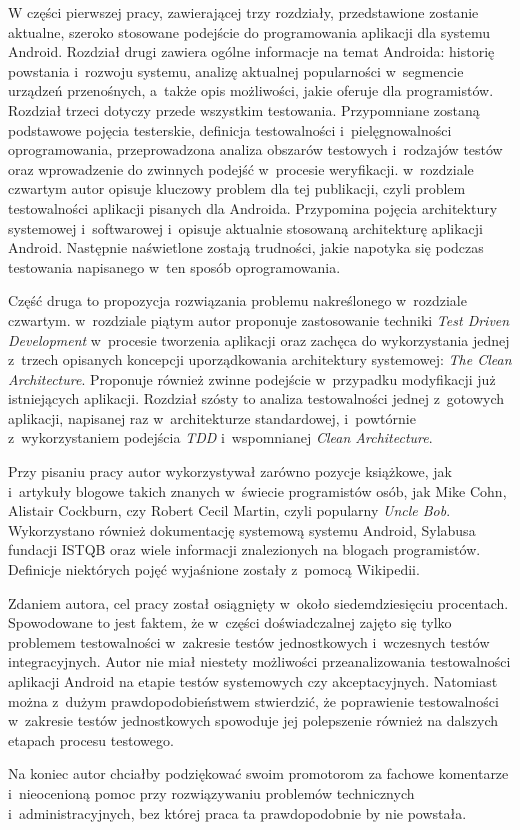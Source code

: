 W części pierwszej pracy, zawierającej trzy rozdziały, przedstawione zostanie aktualne, szeroko stosowane podejście do programowania aplikacji dla systemu Android. Rozdział drugi zawiera ogólne informacje na temat Androida: historię powstania i~rozwoju systemu, analizę aktualnej popularności w~segmencie urządzeń przenośnych, a~także opis możliwości, jakie oferuje dla programistów. Rozdział trzeci dotyczy przede wszystkim testowania. Przypomniane zostaną podstawowe pojęcia testerskie, definicja testowalności i~pielęgnowalności oprogramowania, przeprowadzona analiza obszarów testowych i~rodzajów testów oraz wprowadzenie do zwinnych podejść w~procesie weryfikacji. w~rozdziale czwartym autor opisuje kluczowy problem dla tej publikacji, czyli problem testowalności aplikacji pisanych dla Androida. Przypomina pojęcia architektury systemowej i~softwarowej i~opisuje aktualnie stosowaną architekturę aplikacji Android. Następnie naświetlone zostają trudności, jakie napotyka się podczas testowania napisanego w~ten sposób oprogramowania.

Część druga to propozycja rozwiązania problemu nakreślonego w~rozdziale czwartym. w~rozdziale piątym autor proponuje zastosowanie techniki \textit{Test Driven Development} w~procesie tworzenia aplikacji oraz zachęca do wykorzystania jednej z~trzech opisanych koncepcji uporządkowania architektury systemowej: \textit{The Clean Architecture}. Proponuje również zwinne podejście w~przypadku modyfikacji już istniejących aplikacji. Rozdział szósty to analiza testowalności jednej z~gotowych aplikacji, napisanej raz w~architekturze standardowej, i~powtórnie z~wykorzystaniem podejścia \textit{TDD} i~wspomnianej \textit{Clean Architecture}.

Przy pisaniu pracy autor wykorzystywał zarówno pozycje książkowe, jak i~artykuły blogowe takich znanych w~świecie programistów osób, jak Mike Cohn, Alistair Cockburn, czy Robert Cecil Martin, czyli popularny \textit{Uncle Bob}. Wykorzystano również dokumentację systemową systemu Android, Sylabusa fundacji ISTQB oraz wiele informacji znalezionych na blogach programistów. Definicje niektórych pojęć wyjaśnione zostały z~pomocą Wikipedii. 

Zdaniem autora, cel pracy został osiągnięty w~około siedemdziesięciu procentach. Spowodowane to jest faktem, że w~części doświadczalnej zajęto się tylko problemem testowalności w~zakresie testów jednostkowych i~wczesnych testów integracyjnych. Autor nie miał niestety możliwości przeanalizowania testowalności aplikacji Android na etapie testów systemowych czy akceptacyjnych. Natomiast można z~dużym prawdopodobieństwem stwierdzić, że poprawienie testowalności w~zakresie testów jednostkowych spowoduje jej polepszenie również na dalszych etapach procesu testowego.

Na koniec autor chciałby podziękować swoim promotorom za fachowe komentarze i~nieocenioną pomoc przy rozwiązywaniu problemów technicznych i~administracyjnych, bez której praca ta prawdopodobnie by nie powstała.


